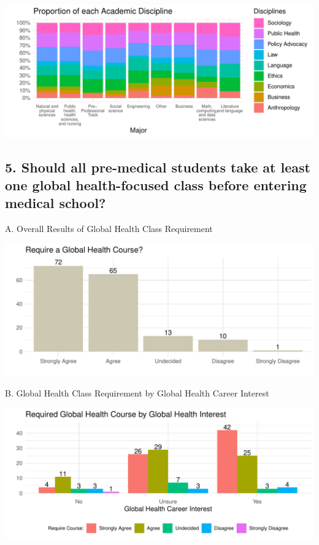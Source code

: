 \documentclass[
  letterpaper,
  DIV=11,
  numbers=noendperiod]{scrartcl}
\begin{document}
\includegraphics{GlobalHealthQuarto1-5_files/figure-pdf/unnamed-chunk-39-1.pdf}

\newpage

\hypertarget{should-all-pre-medical-students-take-at-least-one-global-health-focused-class-before-entering-medical-school}{%
\subsection{5. Should all pre-medical students take at least one global
health-focused class before entering medical
school?}\label{should-all-pre-medical-students-take-at-least-one-global-health-focused-class-before-entering-medical-school}}

A. Overall Results of Global Health Class Requirement

\includegraphics{GlobalHealthQuarto1-5_files/figure-pdf/unnamed-chunk-40-1.pdf}

\newpage

B. Global Health Class Requirement by Global Health Career Interest

\includegraphics{GlobalHealthQuarto1-5_files/figure-pdf/unnamed-chunk-41-1.pdf}
\end{document}
